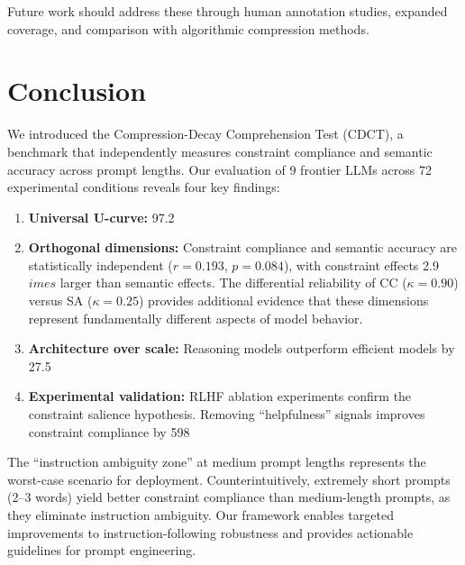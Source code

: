 \documentclass[11pt]{article}
\begin{document}
Future work should address these through human annotation studies, expanded coverage, and comparison with algorithmic compression methods.

\section{Conclusion}

We introduced the Compression-Decay Comprehension Test (CDCT), a benchmark that independently measures constraint compliance and semantic accuracy across prompt lengths. Our evaluation of 9 frontier LLMs across 72 experimental conditions reveals four key findings:

\begin{enumerate}
\item \textbf{Universal U-curve:} 97.2%

\item \textbf{Orthogonal dimensions:} Constraint compliance and semantic accuracy are statistically independent ($r=0.193$, $p=0.084$), with constraint effects 2.9$	imes$ larger than semantic effects. The differential reliability of CC ($\kappa = 0.90$) versus SA ($\kappa = 0.25$) provides additional evidence that these dimensions represent fundamentally different aspects of model behavior.

\item \textbf{Architecture over scale:} Reasoning models outperform efficient models by 27.5%

\item \textbf{Experimental validation:} RLHF ablation experiments confirm the constraint salience hypothesis. Removing ``helpfulness'' signals improves constraint compliance by 598%
\end{enumerate}

The ``instruction ambiguity zone'' at medium prompt lengths represents the worst-case scenario for deployment. Counterintuitively, extremely short prompts (2--3 words) yield better constraint compliance than medium-length prompts, as they eliminate instruction ambiguity. Our framework enables targeted improvements to instruction-following robustness and provides actionable guidelines for prompt engineering.


\end{document}
